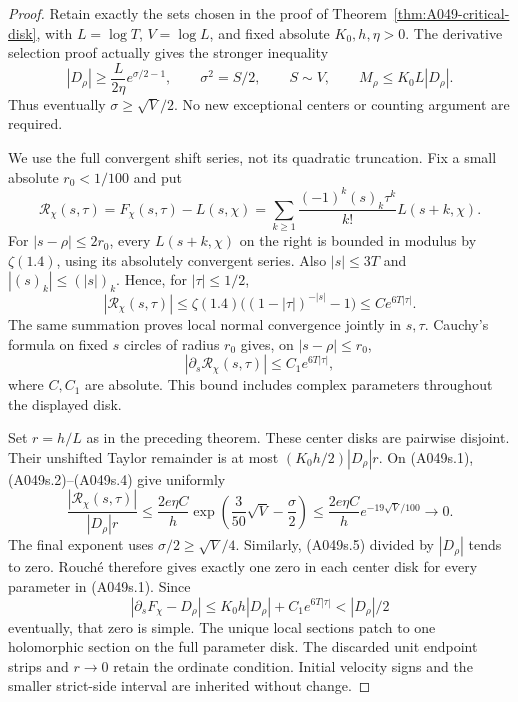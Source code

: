 \begin{proof}
Retain exactly the sets chosen in the proof of
Theorem~\ref{thm:A049-critical-disk}, with $L=\log T$,
$V=\log L$, and fixed absolute $K_0,h,\eta>0$. The derivative
selection proof actually gives the stronger inequality
\[
 |D_\rho|\ge\frac{L}{2\eta}e^{\sigma/2-1},\qquad
 \sigma^2=S/2,\qquad S\sim V,
 \qquad M_\rho\le K_0L|D_\rho|.
\tag{A049s.2}
\]
Thus eventually $\sigma\ge\sqrt V/2$. No new exceptional
centers or counting argument are required.

We use the full convergent shift series, not its quadratic
truncation. Fix a small absolute $r_0<1/100$ and put
\[
 \mathcal R_\chi(s,\tau)=F_\chi(s,\tau)-L(s,\chi)
  =\sum_{k\ge1}\frac{(-1)^k(s)_k\tau^k}{k!}L(s+k,\chi).
\tag{A049s.3}
\]
For $|s-\rho|\le2r_0$, every $L(s+k,\chi)$ on the right
is bounded in modulus by $\zeta(1.4)$, using its absolutely
convergent series. Also $|s|\le3T$ and
$|(s)_k|\le(|s|)_k$. Hence, for $|\tau|\le1/2$,
\[
 |\mathcal R_\chi(s,\tau)|
 \le\zeta(1.4)\bigl((1-|\tau|)^{-|s|}-1\bigr)
 \le C e^{6T|\tau|}.
\tag{A049s.4}
\]
The same summation proves local normal convergence jointly
in $s,\tau$. Cauchy's formula on fixed $s$ circles of radius
$r_0$ gives, on $|s-\rho|\le r_0$,
\[
             |\partial_s\mathcal R_\chi(s,\tau)|
                                        \le C_1e^{6T|\tau|},
\tag{A049s.5}
\]
where $C,C_1$ are absolute. This bound includes complex
parameters throughout the displayed disk.

Set $r=h/L$ as in the preceding theorem. These center disks
are pairwise disjoint. Their unshifted Taylor remainder is
at most $(K_0h/2)|D_\rho|r$. On (A049s.1), (A049s.2)--(A049s.4)
give uniformly
\[
 \frac{|\mathcal R_\chi(s,\tau)|}{|D_\rho|r}
 \le\frac{2e\eta C}{h}
       \exp\left(\frac{3}{50}\sqrt V-\frac{\sigma}{2}\right)
 \le\frac{2e\eta C}{h}e^{-19\sqrt V/100}\longrightarrow0.
\tag{A049s.6}
\]
The final exponent uses $\sigma/2\ge\sqrt V/4$.
Similarly, (A049s.5) divided by $|D_\rho|$ tends to zero.
Rouch\'e therefore gives exactly one zero in each center
disk for every parameter in (A049s.1). Since
\[
 |\partial_sF_\chi-D_\rho|
   \le K_0h|D_\rho|+C_1e^{6T|\tau|}<|D_\rho|/2
\]
eventually, that zero is simple. The unique local sections
patch to one holomorphic section on the full parameter disk.
The discarded unit endpoint strips and $r\to0$ retain the
ordinate condition. Initial velocity signs and the smaller
strict-side interval are inherited without change.
\end{proof}

